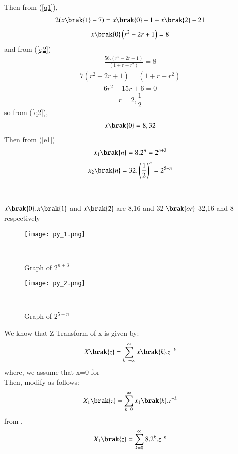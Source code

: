 \documentclass[beamer]{IEEEtran}
\theoremstyle{remark}
\begin{document}
Then from (\ref{q1}),
\begin{align}2(x\brak{1}-7)=x\brak{0}-1+x\brak{2}-21\end{align}
\begin{align}x\brak{0}\left(r^2-2r+1\right)=8\end{align}
and from (\ref{q2})
\begin{align}\frac{56.\left(r^2-2r+1\right)}{\left(1+r+r^2\right)}=8\end{align}
\begin{align}7\left(r^2-2r+1\right)=\left(1+r+r^2\right)\end{align}
\begin{align}6r^2-15r+6=0\end{align}
\begin{equation}
\label{q3}
r=2,\frac{1}{2}
\end{equation}
so from (\ref{q2}),
\begin{align}x\brak{0}=8,32\end{align}
Then from (\ref{e1})
\begin{align}
    \label{a11}
    x_{1}\brak{n}=8.2^{n}=2^{n+3}
\end{align}
\begin{align}
    \label{a12}
    x_{2}\brak{n}=32.\left(\frac{1}{2}\right)^{n}=2^{5-n}
\end{align}\\\\
$x\brak{0}$,$x\brak{1}$ and $x\brak{2}$ are 8,16 and 32 $\brak{or}$ 32,16 and 8 respectively
\begin{figure}[h]
    \centering
    \texttt{[image: py\_1.png]}
    \label{fig:enter-label}
    \caption*{Graph of $2^{n+3}$ }\\
\end{figure}
\begin{figure}[h]
    \centering
    \texttt{[image: py\_2.png]}
    \caption*{Graph of $2^{5-n}$}\\
    \label{fig:enter-label}
\end{figure}
We know that Z-Transform of x is given by:
\begin{align}
\label{a13}
    X\brak{z}=\sum_{k=-\infty}^{\infty} x\brak{k}.z^{-k}
\end{align}
where, we assume that x=0   for \\
\brak{\ref{a13}} Then, modify as follows:
\begin{align}
\label{a14}
    X_1\brak{z}=\sum_{k=0}^{\infty} x_1\brak{k}.z^{-k}
\end{align}
from \brak{\ref{a11}},
\begin{align}X_1\brak{z}=\sum_{k=0}^{\infty} 8.2^k.z^{-k}\end{align}
\end{document}
